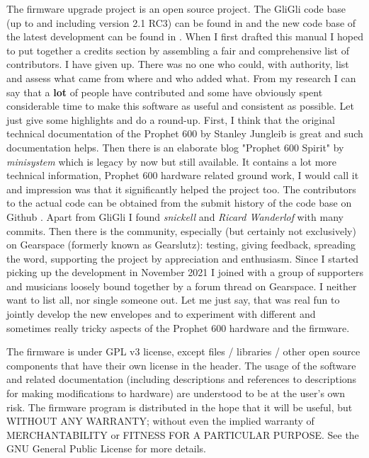 \documentclass[landscape, 11pt, oneside]{report}
\newenvironment{flowtext}{\addmargin[0cm]{7cm}}{\endaddmargin} %
\begin{document}
\begin{flowtext}
The firmware upgrade project is an open source project. The GliGli code base (up to and including version 2.1 RC3) can be found in \cite{gligli} and the new code base of the latest development can be found in \cite{imogen}. When I first drafted this manual I hoped to put together a credits section by assembling a fair and comprehensive list of contributors. I have given up. There was no one who could, with authority, list and assess what came from where and who added what. From my research I can say that a \textbf{lot} of people have contributed and some have obviously spent considerable time to make this software as useful and consistent as possible. Let just give some highlights and do a round-up. First, I think that the original technical documentation of the Prophet 600 by Stanley Jungleib is great and such documentation helps. Then there is an elaborate blog "Prophet 600 Spirit" by \textit{minisystem} \cite{p600spirit} which is legacy by now but still available. It contains a lot more technical information, Prophet 600 hardware related ground work, I would call it and impression was that it significantly helped the project too. The contributors to the actual code can be obtained from the submit history of the code base on Github \cite{imogen}. Apart from GliGli I found \textit{snickell} and \textit{Ricard Wanderlof} with many commits. Then there is the community, especially (but certainly not exclusively) on Gearspace (formerly known as Gearslutz): testing, giving feedback, spreading the word, supporting the project by appreciation and enthusiasm. Since I started picking up the development in November 2021 I joined with a group of supporters and musicians loosely bound together by a forum thread on Gearspace. I neither want to list all, nor single someone out. Let me just say, that was real fun to jointly develop the new envelopes and to experiment with different and sometimes really tricky aspects of the Prophet 600 hardware and the firmware.

The firmware  is under GPL v3 license, except files / libraries / other open source components that have their own license in the header. The usage of the software and related documentation (including descriptions and references to descriptions for making modifications to hardware) are understood to be at the user's own risk. The firmware program is distributed in the hope that it will be useful, but WITHOUT ANY WARRANTY; without even the implied warranty of MERCHANTABILITY or FITNESS FOR A PARTICULAR PURPOSE. See the GNU General Public License for more details.

\end{flowtext}
\end{document}
